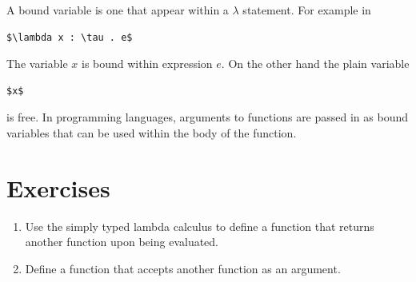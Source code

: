 \documentclass[book.tex]{subfiles}
\begin{document}
A bound variable is one that appear within a $\lambda$ statement. For example in
\begin{lstlisting}
$\lambda x : \tau . e$
\end{lstlisting}
The variable $x$ is bound within expression $e$. On the other hand the plain variable
\begin{lstlisting}
$x$
\end{lstlisting}
is free. In programming languages, arguments to functions are passed in as bound variables that can be used within the body of the function.

\section{Exercises}
\begin{enumerate}
    \item Use the simply typed lambda calculus to define a function that returns another function upon being evaluated.
    \item Define a function that accepts another function as an argument.
\end{enumerate}
\end{document}
